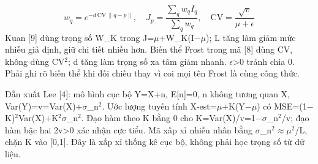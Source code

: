 \documentclass[12pt,a4paper]{extreport}
\begin{document}
\begin{equation}w_q=e^{-d\,\mathrm{CV}\,\|q-p\|},\quad J_p=\frac{\sum_q w_q I_q}{\sum_q w_q},\quad \mathrm{CV}=\frac{\sqrt{v}}{\mu+\epsilon}\tag{2.7}\end{equation}
Kuan [9] dùng trọng số W\_K trong J=\allowbreak{}\ensuremath{\mu}+\allowbreak{}W\_K(I\ensuremath{-}\ensuremath{\mu}); L tăng làm giảm mức nhiễu giả định,\allowbreak{} giữ chi tiết nhiều hơn. Biến thể Frost trong mã [8] dùng CV,\allowbreak{} không dùng CV\ensuremath{{}^2}; d tăng làm trọng số xa tâm giảm nhanh. \ensuremath{\epsilon}>0 tránh chia 0. Phải ghi rõ biến thể khi đối chiếu thay vì coi mọi tên Frost là cùng công thức.
\par
Dẫn xuất Lee [4]: mô hình cục bộ Y=\allowbreak{}X+\allowbreak{}n,\allowbreak{} E[n]=\allowbreak{}0,\allowbreak{} n không tương quan X,\allowbreak{} Var(Y)=\allowbreak{}v=\allowbreak{}Var(X)+\allowbreak{}\ensuremath{\sigma}\_n\ensuremath{{}^2}. Ước lượng tuyến tính X-est=\allowbreak{}\ensuremath{\mu}+\allowbreak{}K(Y\ensuremath{-}\ensuremath{\mu}) có MSE=\allowbreak{}(1\ensuremath{-}K)\ensuremath{{}^2}Var(X)+\allowbreak{}K\ensuremath{{}^2}\ensuremath{\sigma}\_n\ensuremath{{}^2}. Đạo hàm theo K bằng 0 cho K=\allowbreak{}Var(X)/\allowbreak{}v=\allowbreak{}1\ensuremath{-}\ensuremath{\sigma}\_n\ensuremath{{}^2}/\allowbreak{}v; đạo hàm bậc hai 2v>0 xác nhận cực tiểu. Mã xấp xỉ nhiễu nhân bằng \ensuremath{\sigma}\_n\ensuremath{{}^2}\ensuremath{\approx}\ensuremath{\mu}\ensuremath{{}^2}/\allowbreak{}L,\allowbreak{} chặn K vào [0,\allowbreak{}1]. Đây là xấp xỉ thống kê cục bộ,\allowbreak{} không phải học trọng số từ dữ liệu.
\par
\end{document}
